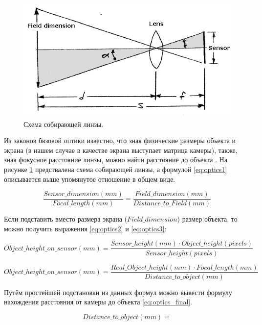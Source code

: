 \documentclass[specification,annotation,times]{itmo-student-thesis}
\begin{document}
	\begin{figure}[!ht]
		\caption{Схема собирающей линзы.}\label{img:optic}
		\includegraphics[width=0.85\linewidth]{../png/optic.png}
		\centering
	\end{figure} 
	
	Из законов бвзовой оптики известно, что зная физические размеры объекта и экрана (в нашем случае в качестве экрана выступает матрица камеры), также, зная фокусное расстояние линзы, можно найти расстояние до объекта \cite{algebra}. На рисунке \ref{img:optic} предствалена схема собирающей линзы, а формулой \ref{eq:optics1} описывается выше упомянутое отношение в общем виде. 
	
	\begin{equation}
	\mathit{\frac{Sensor\_dimension (mm)} {Focal\_length (mm)} = \frac{Field\_dimension (mm)} {Distance\_to\_Field (mm)}}
	\label{eq:optics1}
	\end{equation}
	
	Если подставить вместо размера экрана ($Field\_dimension$) размер объекта, то можно получить выражения \ref{eq:optics2} и \ref{eq:optics3}:
	
	\begin{equation}
	\mathit{Object\_height\_on\_sensor (mm) = \frac{Sensor\_height (mm)  \cdot  Object\_height (pixels)} {Sensor\_height (pixels)}}
	\label{eq:optics2}
	\end{equation}
	
	\begin{equation}
	\mathit{Object\_height\_on\_sensor (mm) = \frac{Real\_Object\_height (mm) \cdot  Focal\_length (mm)} {Distance\_to\_object (mm)}}
	\label{eq:optics3}
	\end{equation}
	
	Путём простейшей подстановки из данных формул можно вывести формулу нахождения расстояния от камеры до объекта \ref{eq:optics_final}.
	
	\begin{equation}
	\mathit{Distance\_to\_object (mm) = }
	\label{eq:optics_final}
	\end{equation}
	
\end{document}
